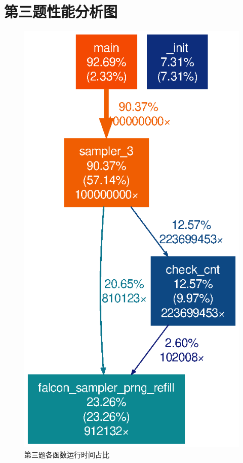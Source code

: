 \documentclass{article}
\begin{document}
    \section{第三题性能分析图}
    \begin{figure}[h!]
        \centering
        \includegraphics[width=.9\textwidth]{../gprof_figs/sampler_3.eps}
        \caption{第三题各函数运行时间占比}
    \end{figure}

    \newpage
\end{document}
